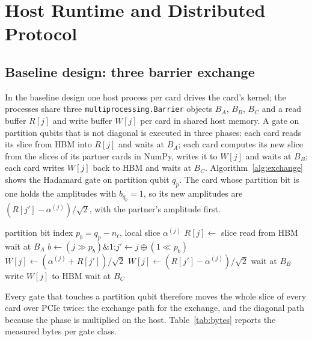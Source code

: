 \documentclass[pdflatex,sn-mathphys-num]{sn-jnl}
\newcommand{\band}{\mathbin{\&}}
\newcommand{\shr}{\mathbin{\gg}}
\newcommand{\shl}{\mathbin{\ll}}
\theoremstyle{thmstyleone}
\theoremstyle{thmstylethree}
\begin{document}
\section{Host Runtime and Distributed Protocol}\label{sec:host}

\subsection{Baseline design: three barrier exchange}\label{subsec:exchange}

In the baseline design one host process per card drives the card's kernel; the processes share three
\texttt{multiprocessing.Barrier} objects $B_A$, $B_B$, $B_C$ and a read buffer $R[j]$ and write buffer $W[j]$ per card in
shared host memory. A gate on partition qubits that is not diagonal is executed in three phases: each card reads its
slice from HBM into $R[j]$ and waits at $B_A$; each card computes its new slice from the slices of its partner cards in
NumPy, writes it to $W[j]$ and waits at $B_B$; each card writes $W[j]$ back to HBM and waits at $B_C$. Algorithm~\ref{alg:exchange}
shows the Hadamard gate on partition qubit $q_p$. The card whose partition bit is one holds the amplitudes with
$b_{q_p}=1$, so its new amplitudes are $(R[j'] - \alpha^{(j)})/\sqrt{2}$, with the partner's amplitude first.

\begin{algorithm}[t]
\caption{Three barrier exchange for $H$ on partition qubit $q_p$ (card $j$, baseline design).}\label{alg:exchange}
\begin{algorithmic}[1]
\Require partition bit index $p_b = q_p - n_\ell$, local slice $\alpha^{(j)}$
\State $R[j] \gets$ slice read from HBM 
\State wait at $B_A$
\State $b \gets (j \shr p_b) \band 1$;\quad $j' \gets j \oplus (1 \shl p_b)$
  \State $W[j] \gets (\alpha^{(j)} + R[j'])/\sqrt{2}$
\Else
  \State $W[j] \gets (R[j'] - \alpha^{(j)})/\sqrt{2}$
\EndIf
\State wait at $B_B$
\State write $W[j]$ to HBM 
\State wait at $B_C$
\end{algorithmic}
\end{algorithm}

Every gate that touches a partition qubit therefore moves the whole slice of every card over PCIe twice: the exchange
path for the exchange, and the diagonal path because the phase is multiplied on the host. Table~\ref{tab:bytes} reports
the measured bytes per gate class.
\end{document}
